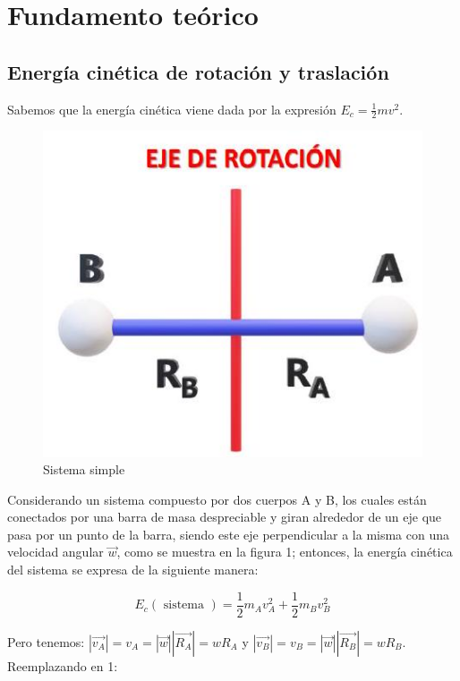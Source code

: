 \documentclass[10pt]{article}
\begin{document}
\section{Fundamento teórico}
\subsection{ Energía cinética de rotación y traslación}
Sabemos que la energía cinética viene dada por la expresión $E_{c}=\frac{1}{2} m v^{2}$.\\

\begin{figure}[H]
    \centering
        \includegraphics[scale = 0.30, center]{2025_04_01_ea720b93e8ebb5d0c6aeg-03}
    \caption{Sistema simple}
\end{figure}

Considerando un sistema compuesto por dos cuerpos A y B, los cuales están conectados por una barra de masa despreciable y giran alrededor de un eje que pasa por un punto de la barra, siendo este eje perpendicular a la misma con una velocidad angular $\vec{w}$, como se muestra en la figura 1; entonces, la energía cinética del sistema se expresa de la siguiente manera:


\begin{equation*}
E_{c}(\text { sistema })=\frac{1}{2} m_{A} v_{A}^{2}+\frac{1}{2} m_{B} v_{B}^{2} \tag{1}
\end{equation*}


Pero tenemos: $\left|\overrightarrow{v_{A}}\right|=v_{A}=|\vec{w}|\left|\overrightarrow{R_{A}}\right|=w R_{A}$ y $\left|\overrightarrow{v_{B}}\right|=v_{B}=|\vec{w}|\left|\overrightarrow{R_{B}}\right|=w R_{B}$. Reemplazando en 1:
\end{document}

